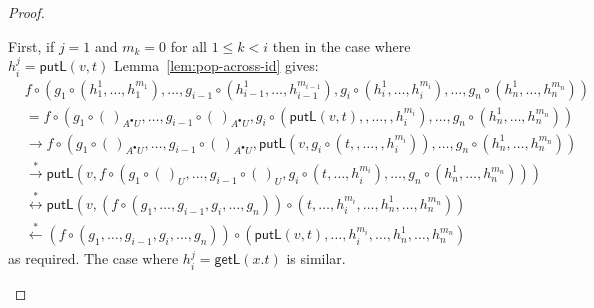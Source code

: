 \documentclass[twoside,11pt,final]{entics}
\newcommand{\getl}{\mathsf{getL}}
\newcommand{\putl}{\mathsf{putL}}
\newcommand{\from}{\leftarrow}
\newcommand{\seq}{,\!\ldots\!,}
\begin{document}
\begin{proof}
\begin{itemize}
First, if $j = 1$ and $m_k = 0$ for all $1 \leq k < i$ then in the case where $h_i^j = \putl(v,t)$ Lemma~\ref{lem:pop-across-id} gives:
  \begin{align*}
    & f \circ (g_1 \circ (h_1^1 \seq h_1^{m_1}) \seq g_{i-1} \circ (h_{i-1}^1 \seq h_{i-1}^{m_{i-1}}),g_i \circ (h_i^1 \seq h_i^{m_i}) \seq g_n \circ (h_n^1 \seq h_n^{m_n}))
    \\&= f \circ (g_1 \circ (\,)_{A^\bullet U} \seq g_{i-1} \circ (\,)_{A^\bullet U},g_i \circ (\putl(v,t),\seq,h_i^{m_i}) \seq g_n\circ (h_n^1 \seq h_n^{m_n}))
    \\& \to f \circ (g_1 \circ (\,)_{A^\bullet U} \seq g_{i-1} \circ (\,)_{A^\bullet U}, \putl(v,g_i \circ (t,\seq,h_i^{m_i})) \seq g_n\circ (h_n^1 \seq h_n^{m_n}))
    \\& \stackrel{*}{\to} \putl(v,f \circ (g_1 \circ (\,)_U\seq g_{i-1} \circ (\,)_U , g_i \circ (t \seq h_i^{m_i})\seq g_n\circ (h_n^1 \seq h_n^{m_n})))
    \\& \stackrel{*}{\leftrightarrow} \putl(v, (f \circ (g_1 \seq g_{i-1},g_i \seq g_n)) \circ (t\seq h_i^{m_i}\seq h_n^1 \seq h_n^{m_n}))
    \\& \stackrel{*}{\from} (f \circ (g_1 \seq g_{i-1},g_i \seq g_n)) \circ (\putl(v,t)\seq h_i^{m_i} \seq h_n^1 \seq h_n^{m_n})
  \end{align*}
  as required. The case where $h_i^j = \getl(x.t)$ is similar. 
  

\end{itemize}
\end{proof}
\end{document}
